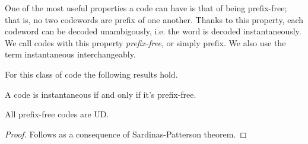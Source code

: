 \documentclass{subfiles}
\begin{document}
    One of the most useful properties a code can have is that of being prefix-free;
        that is, no two codewords are prefix of one another.
        Thanks to this property, each codeword can be decoded unambigously,
        i.e. the word is decoded instantaneously.
        We call codes with this property \emph{prefix-free},
        or simply prefix. We also use the term instantaneous interchangeably.

    For this class of code the following results hold.
    \begin{theorem*}
        A code is instantaneous if and only if it's prefix-free.
    \end{theorem*}

    \begin{theorem*}
        All prefix-free codes are UD.
    \end{theorem*}
    \begin{proof}
        Follows as a consequence of Sardinas-Patterson theorem.
    \end{proof}
\end{document}
